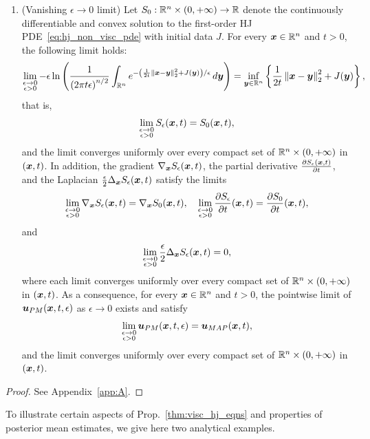 \begin{prop}
\begin{enumerate}
\item[(iv)] (Vanishing $\epsilon \to 0$ limit) Let $S_0:\mathbb{R}^n \times (0,+\infty) \to \mathbb{R}$ denote the continuously differentiable and convex solution to the first-order HJ PDE~\eqref{eq:hj_non_visc_pde} with initial data $J$. For every $\boldsymbol{x}\in\mathbb{R}^n$ and $t>0$, the following limit holds:
\begin{equation} \label{eq:ldp_limit}
\lim_{\substack{\epsilon\to0\\\epsilon>0}} -\epsilon\ln\left(\frac{1}{\left(2\pi t\epsilon\right)^{n/2}}\int_{\mathbb{R}^n}e^{-\left(\frac{1}{2t}\left\Vert \boldsymbol{x}-\boldsymbol{y}\right\Vert _{2}^{2}+J(\boldsymbol{y})\right)/\epsilon}\mathop{}\!d\boldsymbol{y}\right) = \inf_{\boldsymbol{y}\in\mathbb{R}^n}\left\{ \frac{1}{2t}\left\Vert \boldsymbol{x}-\boldsymbol{y}\right\Vert _{2}^{2}+J(\boldsymbol{y})\right\},
\end{equation}
that is,
\[
\lim_{\substack{\epsilon\to0\\\epsilon>0}}S_{\epsilon}(\boldsymbol{x},t) = S_0(\boldsymbol{x},t),
\]
and the limit converges uniformly over every compact set of $\mathbb{R}^n\times(0,+\infty)$ in $(\boldsymbol{x},t)$. In addition, the gradient $\nabla_{\boldsymbol{x}}S_{\epsilon}(\boldsymbol{x},t)$, the partial derivative $\frac{\partial S_{\epsilon}(\boldsymbol{x},t)}{\partial t}$, and the Laplacian $\frac{\epsilon}{2}\Delta_{\boldsymbol x} S_{\epsilon}(\boldsymbol{x},t)$ satisfy the limits
\[
\lim_{\substack{\epsilon\to0\\\epsilon>0}}\nabla_{\boldsymbol{x}}S_{\epsilon}(\boldsymbol{x},t)=\nabla_{\boldsymbol{x}}S_0(\boldsymbol{x},t), \quad\lim_{\substack{\epsilon\to0\\
\epsilon>0}}\frac{\partial S_{\epsilon}}{\partial t}(\boldsymbol{x},t)=\frac{\partial S_0}{\partial t}(\boldsymbol{x},t),
\]
and
\[
\lim_{\substack{\epsilon\to0\\
\epsilon>0}}\frac{\epsilon}{2}\Delta_{\boldsymbol x} S_{\epsilon}(\boldsymbol{x},t)=0,
\]
where each limit converges uniformly over every compact set of $\mathbb{R}^n\times(0,+\infty)$ in $(\boldsymbol{x},t)$. As a consequence, for every $\boldsymbol{x}\in\mathbb{R}^n$ and $t>0$, the pointwise limit of $\boldsymbol{u}_{PM}(\boldsymbol{x},t,\epsilon)$ as $\epsilon\to 0$ exists and satisfy
\[
\lim_{\substack{\epsilon\to0\\\epsilon>0}} \boldsymbol{u}_{PM}(\boldsymbol{x},t,\epsilon) = \boldsymbol{u}_{MAP}(\boldsymbol{x},t),
\]
and the limit converges uniformly over every compact set of $\mathbb{R}^n\times(0,+\infty)$ in $(\boldsymbol{x},t)$.
\end{enumerate}
\end{prop}

\begin{proof}
See Appendix~\ref{app:A}.
\end{proof}

To illustrate certain aspects of Prop.~\ref{thm:visc_hj_eqns} and properties of posterior mean estimates, we give here two analytical examples.

